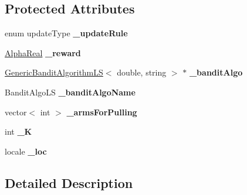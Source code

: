\subsection*{Protected Attributes}
\begin{DoxyCompactItemize}
\item 
\hypertarget{classMultiBoost_1_1BanditLearner_a5da18de48f495ca267c83308482d9ed6}{
enum updateType {\bfseries \_\-updateRule}}
\label{classMultiBoost_1_1BanditLearner_a5da18de48f495ca267c83308482d9ed6}

\item 
\hypertarget{classMultiBoost_1_1BanditLearner_a275c2e66fd26c3f2b186b6cbeb5238f6}{
\hyperlink{Defaults_8h_a80184c4fd10ab70a1a17c5f97dcd1563}{AlphaReal} {\bfseries \_\-reward}}
\label{classMultiBoost_1_1BanditLearner_a275c2e66fd26c3f2b186b6cbeb5238f6}

\item 
\hypertarget{classMultiBoost_1_1BanditLearner_a2d78adb449ebc8dea53550a80f398bac}{
\hyperlink{classMultiBoost_1_1GenericBanditAlgorithmLS}{GenericBanditAlgorithmLS}$<$ double, string $>$ $\ast$ {\bfseries \_\-banditAlgo}}
\label{classMultiBoost_1_1BanditLearner_a2d78adb449ebc8dea53550a80f398bac}

\item 
\hypertarget{classMultiBoost_1_1BanditLearner_a81ef6e87595a53b5a32c7502d560ce5d}{
BanditAlgoLS {\bfseries \_\-banditAlgoName}}
\label{classMultiBoost_1_1BanditLearner_a81ef6e87595a53b5a32c7502d560ce5d}

\item 
\hypertarget{classMultiBoost_1_1BanditLearner_a9474a39d5983d6b2675ce41945ba7dc3}{
vector$<$ int $>$ {\bfseries \_\-armsForPulling}}
\label{classMultiBoost_1_1BanditLearner_a9474a39d5983d6b2675ce41945ba7dc3}

\item 
\hypertarget{classMultiBoost_1_1BanditLearner_aca2e303cdbad52d15457c693e4aeb5fc}{
int {\bfseries \_\-K}}
\label{classMultiBoost_1_1BanditLearner_aca2e303cdbad52d15457c693e4aeb5fc}

\item 
\hypertarget{classMultiBoost_1_1BanditLearner_a04e95a212a2af4b40a6cc36474193364}{
locale {\bfseries \_\-loc}}
\label{classMultiBoost_1_1BanditLearner_a04e95a212a2af4b40a6cc36474193364}

\end{DoxyCompactItemize}


\subsection{Detailed Description}


